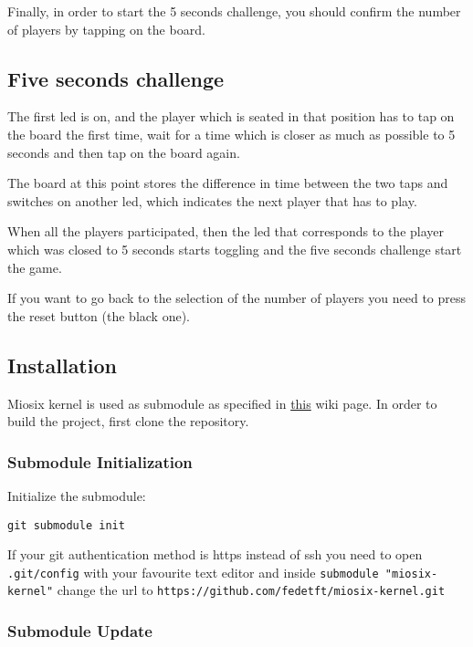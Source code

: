 Finally, in order to start the 5 seconds challenge, you should confirm the number of players by tapping on the board.

\subsection{Five seconds challenge}
The first led is on, and the player which is seated in that position has to
tap on the board the first time, wait for a time which is closer as much as
possible to 5 seconds and then tap on the board again.

The board at this point stores the difference in time between the two taps and
switches on another led, which indicates the next player that has to play.

When all the players participated, then the led that corresponds to the player
which was closed to 5 seconds starts toggling and the five seconds challenge start
the game.

If you want to go back to the selection of the number of players you need to
press the reset button (the black one).

\hypertarget{installation}{%
\subsection{Installation}\label{installation}}

Miosix kernel is used as submodule as specified in
\href{https://miosix.org/wiki/index.php?title=Miosix_and_git_workflow\#Setting_up_an_out_of_git_tree_project}{this}
wiki page.
In order to build the project, first clone the repository.

\hypertarget{submodule-initialization}{%
\subsubsection{Submodule
Initialization}\label{submodule-initialization}}

Initialize the submodule:

\begin{verbatim}
git submodule init
\end{verbatim}

If your git authentication method is https instead of ssh you need to
open \texttt{.git/config} with your favourite text editor and inside
\texttt{submodule\ "miosix-kernel"} change the url to
\texttt{https://github.com/fedetft/miosix-kernel.git}

\hypertarget{submodule-update}{%
\subsubsection{Submodule Update}\label{submodule-update}}

